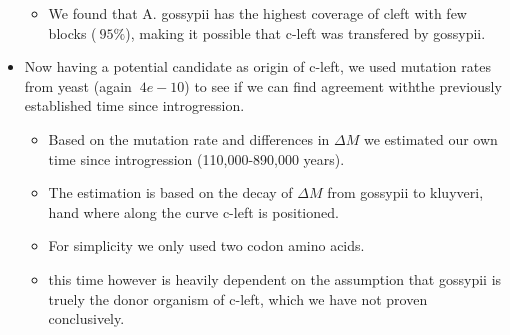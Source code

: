 \documentclass[12pt]{article}
\begin{document}
\begin{itemize}
\begin{itemize}
		\item We found that A. gossypii has the highest coverage of cleft with few blocks ($~95\%$), making it possible that c-left was transfered by gossypii.
	\end{itemize}
	\item Now having a potential candidate as origin of c-left, we used mutation rates from yeast (again $~4e-10$) to see if we can find agreement withthe  previously established time since introgression.
	\begin{itemize}
		\item Based on the mutation rate and differences in $\Delta M$ we estimated our own time since introgression (110,000-890,000 years).
		\item The estimation is based on the decay of $\Delta M$ from gossypii to kluyveri, hand where along the curve c-left is positioned. 
		\item For simplicity we only used two codon amino acids.
		\item this time however is heavily dependent on the assumption that gossypii is truely the donor organism of c-left, which we have not proven conclusively.
	\end{itemize}
\end{itemize}
\end{document}
